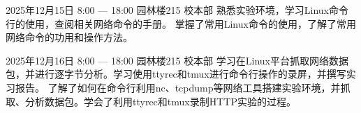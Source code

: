 \documentclass{swfulabjournal}
\begin{document}
\maketitle %

\addjournal%
{2025年12月15日}%
{8:00 --- 18:00}%
{园林楼215}%
{校本部}%
{熟悉实验环境，学习Linux命令行的使用，查阅相关网络命令的手册。}%
{掌握了常用Linux命令的使用，了解了常用网络命令的功用和操作方法。}%




\clearpage
\addjournal%
{2025年12月16日}%
{8:00 --- 18:00}%
{园林楼215}%
{校本部}%
{学习在Linux平台抓取网络数据包，并进行逐字节分析。学习使用ttyrec和tmux进行命令行操作的录屏，并撰写实习报告。}%
{了解了如何在命令行利用nc、tcpdump等网络工具搭建实验环境，并抓取、分析数据包。学会了利用ttyrec和tmux录制HTTP实验的过程。}%
\end{document}
